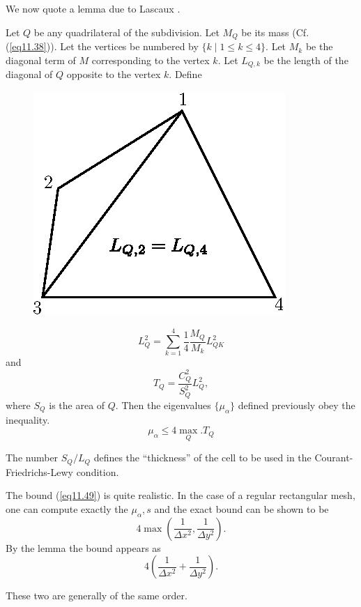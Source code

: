 We now quote a lemma due to Lascaux \cite{key20}. 

\begin{lemma}\label{chap11:lem11.1}
Let $Q$ be any quadrilateral of the subdivision. Let $M_Q$ be its mass (Cf. (\ref{eq11.38})). Let the vertices be numbered by $\{k \mid 1 \leq k \leq 4\}$. Let $M_k$ be the diagonal term of $M$ corresponding to the vertex $k$. Let $L_{Q,k}$ be the length of the diagonal of $Q$ opposite to the vertex $k$. Define

\begin{figure}[H]
\centering
\includegraphics{figures/fig52-11.3.eps}
\caption{}\label{c11:fig11.3}
\end{figure}
$$
L^2_Q = \sum\limits^4_{k=1} \frac{1}{4} \frac{M_Q}{M_k} L^2_{QK}
$$
and
$$
T_Q = \frac{C^2_Q}{S^2_Q} L^2_Q,
$$
where $S_Q$ is the area of $Q$. Then the eigenvalues $\{\mu_\alpha\}$ defined previously obey the inequality.
\begin{equation*}
\mu_\alpha \leq 4 \max\limits_Q . T_Q \tag{11.49}\label{eq11.49}
\end{equation*}
\end{lemma}

\begin{remark}\label{chap11:rem11.3}
The number $S_Q / L_Q$ defines the ``thickness'' of the cell to be used in the Courant-Friedrichs-Lewy condition.
\end{remark}

\begin{remark}\label{chap11:rem11.4}
The bound (\ref{eq11.49}) is quite realistic. In the case of a regular
rectangular mesh, one can compute exactly the $\mu_\alpha, s$ and the
exact bound can be shown to be\pageoriginale 
$$
4 \max \left(\frac{1}{\Delta x^2} , \frac{1}{\Delta y^2}\right). 
$$  
By the lemma the bound appears as
$$
4 \left(\frac{1}{\Delta x^2} + \frac{1}{\Delta y^2}\right). 
$$

These two are generally of the same order.
\end{remark}

